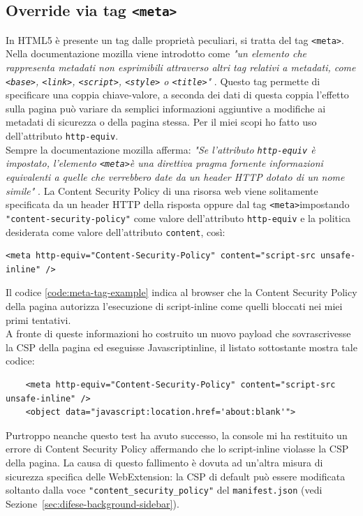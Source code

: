 \documentclass{sapthesis}
\newcommand{\code}[1]{\texttt{#1}}
\newcommand{\refSection}[1]{Sezione~\ref{#1}}
\newcommand{\JS}{Javascript}
\newcommand{\manifest}{\code{manifest.json} }
\newcommand{\tagHTML}[1]{\code{<#1>}}
\newcommand{\meta}{\tagHTML{meta}}
\newcommand{\script}{\tagHTML{script}}
\begin{document}
        \subsection{Override via tag \meta}
        \label{sec:attaccando-vuln-bypass-meta}
            In HTML5 è presente un tag dalle proprietà peculiari, si tratta del tag \meta.
            Nella documentazione mozilla viene introdotto come \textit{"un elemento che rappresenta 
            metadati non esprimibili attraverso altri tag relativi a metadati, come \code{<base>}, 
            \code{<link>}, \script, \code{<style>} o \code{<title>}"} \cite{tag-meta}.
            Questo tag permette di specificare una coppia chiave-valore, a seconda dei dati di
            questa coppia l'effetto sulla pagina può variare da semplici informazioni aggiuntive
            a modifiche ai metadati di sicurezza o della pagina stessa. Per il miei scopi ho fatto
            uso dell'attributo \code{http-equiv}.\\
            Sempre la documentazione mozilla afferma: \textit{"Se l'attributo \code{http-equiv} è impostato,
            l'elemento \meta è una direttiva pragma fornente informazioni equivalenti a quelle che
            verrebbero date da un header HTTP dotato di un nome simile"} \cite{tag-meta}. La Content
            Security Policy di una risorsa web viene solitamente specificata da un header HTTP della
            risposta oppure dal tag \meta impostando \code{"content-security-policy"} come valore
            dell'attributo \code{http-equiv} e la politica desiderata come valore dell'attributo \code{content},
            così:
            \begin{lstlisting}[label=code:meta-tag-example]
<meta http-equiv="Content-Security-Policy" content="script-src unsafe-inline" />
\end{lstlisting}
            Il codice \ref{code:meta-tag-example} indica al browser che la Content Security Policy della
            pagina autorizza l'esecuzione di script-inline come quelli bloccati nei miei primi tentativi.\\
            A fronte di queste informazioni ho costruito un nuovo payload che sovrascrivesse la CSP della
            pagina ed eseguisse \JS inline, il listato sottostante mostra tale codice:
            \begin{lstlisting}
    <meta http-equiv="Content-Security-Policy" content="script-src unsafe-inline" />
    <object data="javascript:location.href='about:blank'">
\end{lstlisting}
            Purtroppo neanche questo test ha avuto successo, la console mi ha restituito un errore di Content
            Security Policy affermando che lo script-inline violasse la CSP della pagina. La causa
            di questo fallimento è dovuta ad un'altra misura di sicurezza specifica delle WebExtension: la CSP
            di default può essere modificata soltanto dalla voce \code{"content\_security\_policy"} del 
            \manifest (vedi \refSection{sec:difese-background-sidebar}).\\
        
\end{document}
